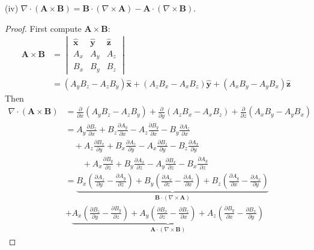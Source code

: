 \documentclass[a4paper]{article}
\begin{document}
(iv) \( \nabla \cdot \!\left( \pmb{A} \times \pmb{B} \right) = \pmb{B} \cdot \!\left( \nabla \times \pmb{A} \right) - \pmb{A} \cdot \!\left( \nabla \times \pmb{B} \right) \).
\begin{proof}[Proof]
First compute \( \pmb{A} \times \pmb{B} \):
\begin{align*}
	\pmb{A} \times \pmb{B} & = \begin{vmatrix}
		\pmb{\hat{x}} & \pmb{\hat{y}} & \pmb{\hat{z}} \\
		A_{x} & A_{y} & A_{z} \\
		B_{x} & B_{y} & B_{z}
	\end{vmatrix} \\
	 & = \!\left( A_{y}B_{z} - A_{z}B_{y} \right)\pmb{\hat{x}} + \!\left( A_{z}B_{x} - A_{x}B_{z} \right)\pmb{\hat{y}} + \!\left( A_{x}B_{y} - A_{y}B_{x} \right)\pmb{\hat{z}}
\end{align*}
Then
\begin{align*}
	\nabla \cdot \!\left( \pmb{A} \times \pmb{B} \right) & = \frac{\partial }{\partial x}\!\left( A_{y}B_{z} - A_{z}B_{y} \right) + \frac{\partial }{\partial y}\!\left( A_{z}B_{x} - A_{x}B_{z} \right) + \frac{\partial }{\partial z}\!\left( A_{x}B_{y} - A_{y}B_{x} \right) \\
	 & = A_{y}\frac{\partial B_{z}}{\partial x} + B_{z}\frac{\partial A_{y}}{\partial x} - A_{z}\frac{\partial B_{y}}{\partial x} - B_{y}\frac{\partial A_{z}}{\partial x} \\ 
	 & \quad + A_{z}\frac{\partial B_{x}}{\partial y} + B_{x}\frac{\partial A_{z}}{\partial y} - A_{x}\frac{\partial B_{z}}{\partial y} - B_{z}\frac{\partial A_{x}}{\partial y} \\
	 & \qquad + A_{x}\frac{\partial B_{y}}{\partial z} + B_{y}\frac{\partial A_{x}}{\partial z} - A_{y}\frac{\partial B_{x}}{\partial z} - B_{x}\frac{\partial A_{y}}{\partial z} \\
	 & = \underbrace{B_{x}\!\left( \frac{\partial A_{z}}{\partial y} - \frac{\partial A_{y}}{\partial z} \right) + B_{y}\!\left( \frac{\partial A_{x}}{\partial z} - \frac{\partial A_{z}}{\partial x} \right) + B_{z}\!\left( \frac{\partial A_{y}}{\partial x} - \frac{\partial A_{x}}{\partial y} \right)}_{\pmb{B} \cdot \!\left( \nabla \times \pmb{A} \right)} \\
	 & + \underbrace{A_{x}\!\left( \frac{\partial B_{z}}{\partial y} - \frac{\partial B_{y}}{\partial z} \right) + A_{y}\!\left( \frac{\partial B_{x}}{\partial z} - \frac{\partial B_{z}}{\partial x} \right) + A_{z}\!\left( \frac{\partial B_{y}}{\partial x} - \frac{\partial B_{x}}{\partial y} \right)}_{\pmb{A} \cdot \!\left( \nabla \times \pmb{B} \right)}
\end{align*}
\end{proof}
\end{document}
